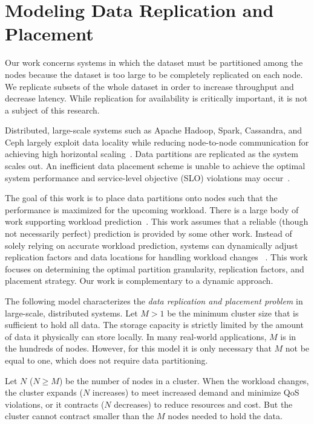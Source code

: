 \section{Modeling Data Replication and Placement}
\label{sec:model}

Our work concerns systems in which the dataset
must be partitioned among the nodes because the dataset
is too large to be completely
replicated on each node.
We replicate subsets of the whole dataset in order to increase
throughput and decrease latency.
While replication for availability is critically important, it is not a
subject of this research. 

Distributed, large-scale systems such as
Apache Hadoop, Spark, Cassandra, and Ceph
largely exploit data locality while reducing node-to-node
communication for achieving high horizontal
scaling~\cite{DeanJ2004_MapReduce,zaharia2010spark,Lakshman2010,SageWeil2006Ceph}. 
Data partitions are replicated as the system scales out.
An inefficient data placement scheme is unable to achieve the
optimal system performance and service-level objective (SLO)
violations may occur~\cite{Rodrigues2013,Cruz2013,Trushkowsky2011,Majors2010}.

The goal of this work is to place data partitions onto nodes such
that the performance is maximized for the upcoming workload.
There is a large body of work supporting workload
prediction~\cite{Gmach2007,box2015time,Akdere2012}.
This work assumes that a reliable (though not
necessarily perfect) prediction is provided by some other work.
Instead of solely relying on accurate workload prediction,
systems can dynamically adjust replication factors
and data locations for handling workload changes
~\cite{Lim2010, Trushkowsky2011, Cruz2013}.
This work focuses on determining the optimal
partition granularity, replication factors, and placement strategy.
Our work is complementary to a dynamic approach.

The following model characterizes the 
\emph{data replication and placement problem} in large-scale,
distributed systems. 
Let $M>1$ be the minimum cluster size that is sufficient to hold all
data.
The storage capacity is strictly limited by the amount of data it
physically can store locally.
In many real-world applications, $M$ is in the hundreds of nodes.
However, for this model it is only necessary that $M$ not be equal to
one, which does not require data partitioning.

Let $N$ ($N \ge M$) be the number of nodes in a cluster.
When the workload changes, the cluster expands ($N$ increases)
to meet increased demand and minimize QoS violations, or it contracts
($N$ decreases) to reduce resources and cost. 
But the cluster cannot contract smaller than the $M$ nodes needed to
hold the data.

